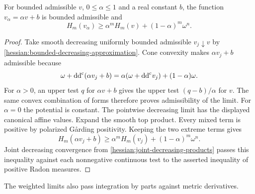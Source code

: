 \begin{lemma}\label{hessian:convex-background-term}
For bounded admissible $v$, $0\leq\alpha\leq1$ and a real constant
$b$, the function $v_\alpha=\alpha v+b$ is bounded admissible and
\[
 H_m(v_\alpha)\geq\alpha^m H_m(v)+(1-\alpha)^m\omega^n.
\]
\end{lemma}
\begin{proof}
Take smooth decreasing uniformly bounded admissible $v_j\downarrow v$
by \cref{hessian:bounded-decreasing-approximation}. Cone convexity makes $\alpha v_j+b$ admissible because
\[
 \omega+\mathrm{dd}^{\mathrm{c}}(\alpha v_j+b)
        =\alpha(\omega+\mathrm{dd}^{\mathrm{c}} v_j)+(1-\alpha)\omega.
\]
For $\alpha>0$, an upper test $q$ for $\alpha v+b$ gives the
upper test $(q-b)/\alpha$ for $v$. The same convex combination
of forms therefore proves admissibility of the limit. For
$\alpha=0$ the potential is constant. The pointwise decreasing
limit has the displayed canonical affine values.
Expand the smooth top product. Every mixed term is positive by
polarized G\aa rding positivity. Keeping the two extreme terms gives
\[
 H_m(\alpha v_j+b)\geq\alpha^m H_m(v_j)
                                    +(1-\alpha)^m\omega^n.
\]
Joint decreasing convergence from
\cref{hessian:joint-decreasing-products} passes this inequality
against each nonnegative continuous test to the asserted inequality
of positive Radon measures.
\end{proof}

The weighted limits also pass integration by parts against metric
derivatives.

